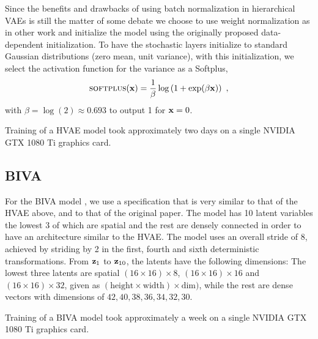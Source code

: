 {Since the benefits and drawbacks of using batch normalization \parencite{ioffe_batch_2015} in hierarchical VAEs is still the matter of some debate \parencite{sonderby_ladder_2016, vahdat_nvae_2020, child_very_2021} we choose to use weight normalization \parencite{salimans_weight_2016} as in other work \parencite{maaloe_biva_2019} and initialize the model using the originally proposed data-dependent initialization.
To have the stochastic layers initialize to standard Gaussian distributions (zero mean, unit variance), with this initialization, we select the activation function for the variance as a Softplus,
\begin{equation*}
    \textsc{softplus}({\mathbf{x}}) = \frac{1}{\beta}\log\left(1 + \exp(\beta{\mathbf{x}})\right) \ ,
\end{equation*}
with $\beta = \log(2) \approx 0.693$ to output 1 for ${\mathbf{x}} = 0$.

Training of a HVAE model took approximately two days on a single NVIDIA GTX 1080 Ti graphics card.


\subsection{BIVA}
For the BIVA model \parencite{maaloe_biva_2019}, we use a specification that is very similar to that of the HVAE above, and to that of the original paper.
The model has 10 latent variables the lowest 3 of which are spatial and the rest are densely connected in order to have an architecture similar to the HVAE.
The model uses an overall stride of 8, achieved by striding by 2 in the first, fourth and sixth deterministic transformations.
From ${\mathbf{z}}_1$ to ${\mathbf{z}}_{10}$, the latents have the following dimensions: The lowest three latents are spatial $(16\times16)\times8$, $(16\times16)\times16$ and $(16\times16)\times32$, given as $(\text{height}\times\text{width})\times\text{dim})$, while the rest are dense vectors with dimensions of $42, 40, 38, 36, 34, 32, 30$.

Training of a BIVA model took approximately a week on a single NVIDIA GTX 1080 Ti graphics card.


}
